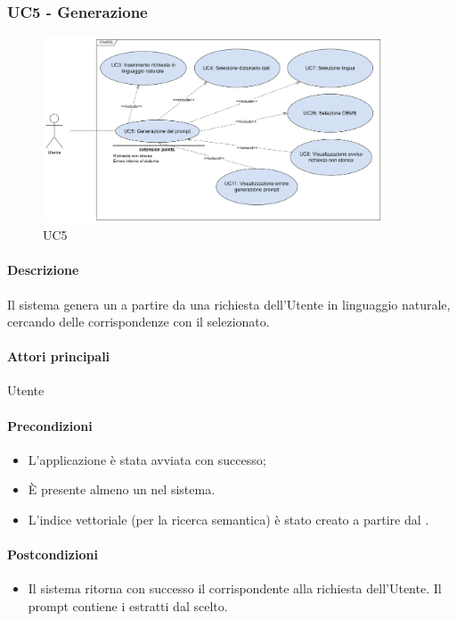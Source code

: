 \subsubsection{UC5 - Generazione }\label{UC5}

\begin{figure}[H]
  \centering
  \includegraphics[width=0.90\textwidth]{assets/uc5.png}
  \caption{UC5}
\end{figure}

\paragraph*{Descrizione}
Il sistema genera un  a partire da una richiesta dell'Utente in linguaggio naturale, cercando delle corrispondenze con il  selezionato.

\paragraph*{Attori principali}
Utente

\paragraph*{Precondizioni}
\begin{itemize}
  \item L'applicazione è stata avviata con successo;
  \item È presente almeno un  nel sistema.
  \item L'indice vettoriale (per la ricerca semantica) è stato creato a partire dal .
\end{itemize}

\paragraph*{Postcondizioni}
\begin{itemize}
  \item Il sistema ritorna con successo il  corrispondente alla richiesta dell'Utente. Il prompt contiene i  estratti dal  scelto.
\end{itemize}

